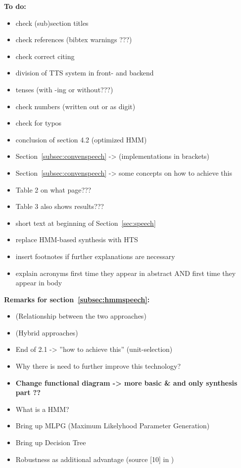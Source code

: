 \vspace{2em}
\textbf{\large To do:}
\vspace{1em}
\begin{itemize}[leftmargin=10pt]
	\item check (sub)section titles
	\item check references (bibtex warnings ???)
	\item check correct citing
	\item division of TTS system in front- and backend
	\item \textcolor{black!40}{tenses (with -ing or without???)}
	\item check numbers (written out or as digit)
	\item \textcolor{black!40}{check for typos}
	\item conclusion of section 4.2 (optimized HMM)
	\item Section~\ref{subsec:convenspeech} -> (implementations in brackets)
	\item Section~\ref{subsec:convenspeech} -> some concepts on how to achieve this
	\item Table 2 on what page???
	\item Table 3 also shows results???
	\item short text at beginning of Section~\ref{sec:speech}
	\item \textcolor{black!40}{replace HMM-based synthesis with HTS}
	\item insert footnotes if further explanations are necessary
	\item explain acronyms first time they appear in abstract AND first time they appear in body
\end{itemize}

\vspace{2em}
\textbf{\large Remarks for section~\ref{subsec:hmmspeech}:}
\vspace{1em}
\begin{itemize}[leftmargin=10pt]
	\item (Relationship between the two approaches)
	\item \textcolor{black!40}{(Hybrid approaches)}
	\item End of 2.1 -> ''how to achieve this'' (unit-selection)
	\item Why there is need to further improve this technology?
	\item \textbf{Change functional diagram -> more basic \& and only synthesis part ??}
	\item What is a HMM?
	\item Bring up MLPG (Maximum Likelyhood Parameter Generation)
	\item Bring up Decision Tree
	\item Robustness as additional advantage (source [10] in \cite{zen:deepstatistical})
\end{itemize}

